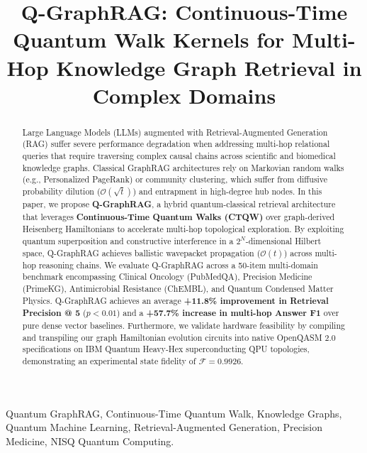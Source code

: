 \documentclass[conference]{IEEEtran}
\begin{document}
\title{Q-GraphRAG: Continuous-Time Quantum Walk Kernels for Multi-Hop Knowledge Graph Retrieval in Complex Domains}

\author{
}

\maketitle

\begin{abstract}
Large Language Models (LLMs) augmented with Retrieval-Augmented Generation (RAG) suffer severe performance degradation when addressing multi-hop relational queries that require traversing complex causal chains across scientific and biomedical knowledge graphs. Classical GraphRAG architectures rely on Markovian random walks (e.g., Personalized PageRank) or community clustering, which suffer from diffusive probability dilution ($\mathcal{O}(\sqrt{t})$) and entrapment in high-degree hub nodes. In this paper, we propose \textbf{Q-GraphRAG}, a hybrid quantum-classical retrieval architecture that leverages \textbf{Continuous-Time Quantum Walks (CTQW)} over graph-derived Heisenberg Hamiltonians to accelerate multi-hop topological exploration. By exploiting quantum superposition and constructive interference in a $2^N$-dimensional Hilbert space, Q-GraphRAG achieves ballistic wavepacket propagation ($\mathcal{O}(t)$) across multi-hop reasoning chains. We evaluate Q-GraphRAG across a 50-item multi-domain benchmark encompassing Clinical Oncology (PubMedQA), Precision Medicine (PrimeKG), Antimicrobial Resistance (ChEMBL), and Quantum Condensed Matter Physics. Q-GraphRAG achieves an average \textbf{+11.8\% improvement in Retrieval Precision @ 5} ($p < 0.01$) and a \textbf{+57.7\% increase in multi-hop Answer F1} over pure dense vector baselines. Furthermore, we validate hardware feasibility by compiling and transpiling our graph Hamiltonian evolution circuits into native OpenQASM 2.0 specifications on IBM Quantum Heavy-Hex superconducting QPU topologies, demonstrating an experimental state fidelity of $\mathcal{F} = 0.9926$.
\end{abstract}

\begin{IEEEkeywords}
Quantum GraphRAG, Continuous-Time Quantum Walk, Knowledge Graphs, Quantum Machine Learning, Retrieval-Augmented Generation, Precision Medicine, NISQ Quantum Computing.
\end{IEEEkeywords}
\end{document}

